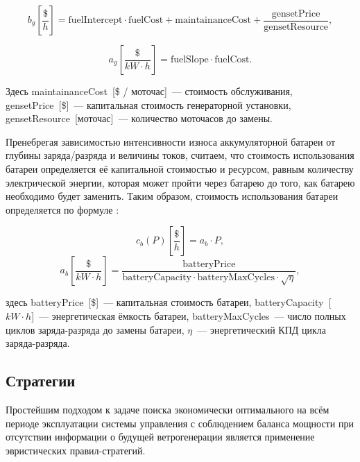 \documentclass{report}
\begin{document}
\begin{equation}\label{f:bg}
b_g \left[\frac{\$}{h} \right] = 
\text{fuelIntercept} \cdot \text{fuelCost} + \text{maintainanceCost} +
\frac{\text{gensetPrice}}{\text{gensetResource}},
\end{equation}

\begin{equation}\label{f:ag}
a_g \left[ \frac{\$}{kW\cdot h} \right] = 
\text{fuelSlope} \cdot \text{fuelCost}.
\end{equation}

Здесь maintainanceCost~[\$ / моточас]~--- стоимость обслуживания,\\ 
gensetPrice~[\$]~--- капитальная стоимость генераторной установки,\\
gensetResource~[моточас]~--- количество моточасов до замены.

Пренебрегая зависимостью интенсивности износа аккумуляторной батареи от глубины заряда/разряда и величины токов, считаем, что стоимость использования батареи определяется её капитальной стоимостью и ресурсом, равным количеству электрической энергии, которая может пройти через батарею до того, как батарею необходимо будет заменить.
Таким образом, стоимость использования батареи определяется по формуле \cite{bwc}:


\begin{equation}\label{f:cb}
c_b(P) \left[\frac{\$}{h} \right] = 
a_b \cdot P,
\end{equation}
\begin{equation}\label{f:ab}
a_b \left[ \frac{\$}{kW\cdot h} \right] =
\frac{\text{batteryPrice}}{\text{batteryCapacity} \cdot \text{batteryMaxCycles} 
\cdot \sqrt{\eta}} ,
\end{equation}

здесь batteryPrice~[\$]~--- капитальная стоимость батареи, batteryCapacity~[$kW\cdot h$]~--- энергетическая ёмкость батареи, batteryMaxCycles~--- число полных циклов заряда-разряда до замены батареи, $\eta$~--- энергетический КПД цикла заряда-разряда.

\subsection{Стратегии}

Простейшим подходом к задаче поиска экономически оптимального на всём периоде эксплуатации системы управления с соблюдением баланса мощности при отсутствии информации о будущей ветрогенерации является применение эвристических правил-стратегий.
\end{document}
